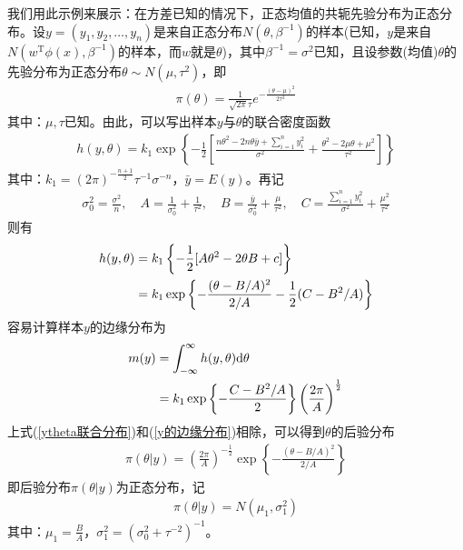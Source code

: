         \begin{example}[正态均值的共轭先验分布为正态分布]
        \par
        我们用此示例来展示：在方差已知的情况下，正态均值的共轭先验分布为正态分布。设$y = (y_1,y_2,\dots,y_n)$是来自正态分布$N(\theta,\beta^{-1})$的样本(已知，$y$是来自$N(w^\mathrm{T}\phi(x),\beta^{-1})$的样本，而$w$就是$\theta$)，其中$\beta^{-1} = \sigma^2$已知，且设参数(均值)$\theta$的先验分布为正态分布$\theta\sim N(\mu,\tau^2)$，即
        \begin{align*}
        \pi(\theta) = \frac{1}{\sqrt{2\pi}\tau}e^{-\frac{(\theta-\mu)^2}{2\tau^2}}
        \end{align*}
        其中：$\mu,\tau$已知。由此，可以写出样本$y$与$\theta$的联合密度函数
        \begin{align*}
        h(y,\theta) = k_1\exp\left\{ -\frac{1}{2}\left[ \frac{n\theta^2-2n\theta\bar{y} + \sum\limits_{i=1}^n y_i^2 }{\sigma^2}  +\frac{\theta^2-2\mu\theta + \mu^2}{\tau^2} \right] \right\}
        \end{align*}
        其中：$k_1 = (2\pi)^{-\frac{n+1}{2}} \tau^{-1}\sigma^{-n}$，$\bar{y} = E(y)$。再记
        \begin{align*}
        \sigma_0^2 = \frac{\sigma^2}{n},\quad A = \frac{1}{\sigma_0^2}+ \frac{1}{\tau^2},\quad B = \frac{\bar{y}}{\sigma_0^2}+\frac{\mu}{\tau^2},\quad C = \frac{\sum_{i=1}^n y_i^2}{\sigma^2}+ \frac{\mu^2}{\tau^2}
        \end{align*}
        则有
        \begin{align}
        \label{ytheta联合分布}
        h(y,\theta) &= k_1\left\{ -\frac{1}{2}[A\theta^2 - 2\theta B + c] \right\}\notag\\
        &=k_1\exp \left\{ -\frac{(\theta-B/A)^2}{2/A} - \frac{1}{2}(C-B^2/A) \right\}
        \end{align}
        容易计算样本$y$的边缘分布为
        \begin{align}
        \label{y的边缘分布}
        m(y) &=\int_{-\infty}^\infty h(y,\theta)\mathrm{d}\theta\notag \\
        &= k_1\exp\left\{-\frac{C-B^2/A}{2}\right\} \left( \frac{2\pi}{A} \right)^{\frac{1}{2}}
        \end{align}
        上式(\ref{ytheta联合分布})和(\ref{y的边缘分布})相除，可以得到$\theta$的后验分布
        \begin{align*}
        \pi(\theta|y) = \left( \frac{2\pi}{A} \right)^{-\frac{1}{2}}  \exp\left\{-\frac{(\theta - B/A)^2 }{2/A}\right\}
        \end{align*}
        即后验分布$\pi(\theta|y)$为正态分布，记
        \begin{align*}
        \pi(\theta|y) = N(\mu_1,\sigma_1^2)
        \end{align*}
        其中：$\mu_1 = \frac{B}{A}$，$\sigma_1^2 = \left( \sigma_0^2 + \tau^{-2} \right)^{-1} $。
        \end{example}
